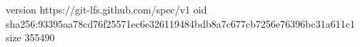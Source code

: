 version https://git-lfs.github.com/spec/v1
oid sha256:93395aa78cd76f25571ec6e326119484bdb8a7c677cb7256e76396bc31a611c1
size 355490
